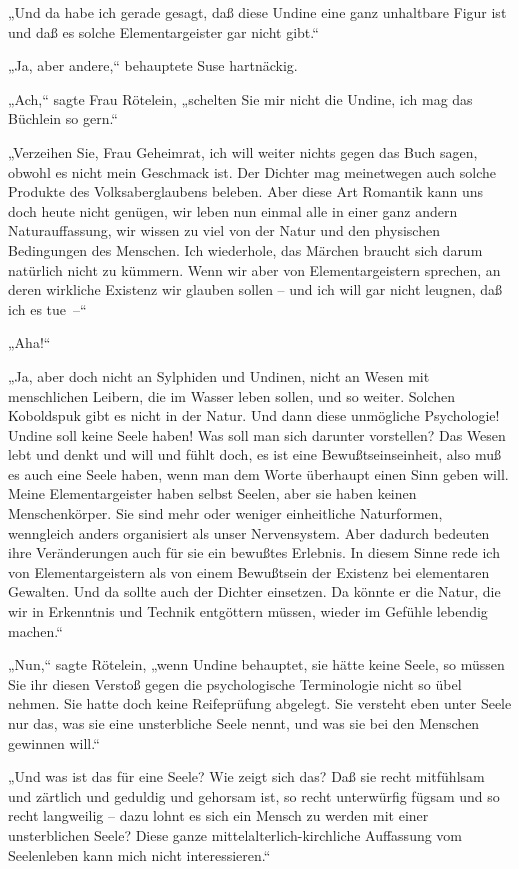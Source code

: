 „Und da habe ich gerade gesagt, daß diese Undine eine ganz
unhaltbare Figur ist und daß es solche Elementargeister gar nicht
gibt.“

„Ja, aber andere,“ behauptete Suse hartnäckig.

„Ach,“ sagte Frau Rötelein, „schelten Sie mir nicht die Undine, ich
mag das Büchlein so gern.“

„Verzeihen Sie, Frau Geheimrat, ich will weiter nichts gegen das
Buch sagen, obwohl es nicht mein Geschmack ist. Der Dichter mag
meinetwegen auch solche Produkte des Volksaberglaubens beleben.
Aber diese Art Romantik kann uns doch heute nicht genügen, wir
leben nun einmal alle in einer ganz andern Naturauffassung, wir
wissen zu viel von der Natur und den physischen Bedingungen des
Menschen. Ich wiederhole, das Märchen braucht sich darum natürlich
nicht zu kümmern. Wenn wir aber von Elementargeistern sprechen, an
deren wirkliche Existenz wir glauben sollen – und ich will gar
nicht leugnen, daß ich es tue~–“

„Aha!“

„Ja, aber doch nicht an Sylphiden und Undinen, nicht an Wesen mit
menschlichen Leibern, die im Wasser leben sollen, und so weiter.
Solchen Koboldspuk gibt es nicht in der Natur. Und dann diese
unmögliche Psychologie! Undine soll keine Seele haben! Was soll man
sich darunter vorstellen? Das Wesen lebt und denkt und will und
fühlt doch, es ist eine Bewußtseinseinheit, also muß es auch eine
Seele haben, wenn man dem Worte überhaupt einen Sinn geben will.
Meine Elementargeister haben selbst Seelen, aber sie haben keinen
Menschenkörper. Sie sind mehr oder weniger einheitliche
Naturformen, wenngleich anders organisiert als unser Nervensystem.
Aber dadurch bedeuten ihre Veränderungen auch für sie ein bewußtes
Erlebnis. In diesem Sinne rede ich von Elementargeistern als von
einem Bewußtsein der Existenz bei elementaren Gewalten. Und da
sollte auch der Dichter einsetzen. Da könnte er die Natur, die wir
in Erkenntnis und Technik entgöttern müssen, wieder im Gefühle
lebendig machen.“

„Nun,“ sagte Rötelein, „wenn Undine behauptet, sie hätte keine
Seele, so müssen Sie ihr diesen Verstoß gegen die psychologische
Terminologie nicht so übel nehmen. Sie hatte doch keine
Reifeprüfung abgelegt. Sie versteht eben unter Seele nur das, was
sie eine unsterbliche Seele nennt, und was sie bei den Menschen
gewinnen will.“

„Und was ist das für eine Seele? Wie zeigt sich das? Daß sie recht
mitfühlsam und zärtlich und geduldig und gehorsam ist, so recht
unterwürfig fügsam und so recht langweilig – dazu lohnt es sich ein
Mensch zu werden mit einer unsterblichen Seele? Diese ganze
mittelalterlich-kirchliche Auffassung vom Seelenleben kann mich
nicht interessieren.“

